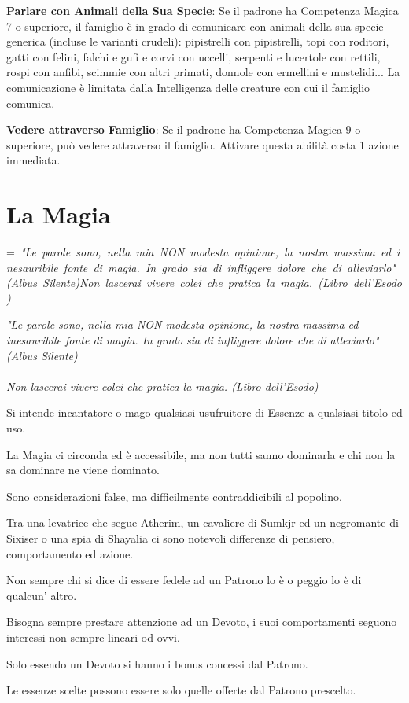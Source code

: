 \documentclass[a4paper,11pt,twoside,openany]{book}
\makeatletter
\newcommand{\mybox}[1]{%
	\setbox0=\hbox{#1}%
	\setlength{\@tempdima}{\dimexpr\wd0+13pt}%
	\begin{tcolorbox}[boxrule=0.5pt,arc=4pt, breakable,enhanced,
		left=6pt,right=6pt,top=6pt,bottom=6pt,boxsep=0pt,width=\@tempdima]
		#1
	\end{tcolorbox}
}
\makeatother
\begin{document}
\textbf{Parlare con Animali della Sua Specie}: Se il padrone ha Competenza Magica 7 o superiore, il famiglio è in grado di comunicare con animali della sua specie generica (incluse le varianti crudeli): pipistrelli con pipistrelli, topi con roditori, gatti con felini, falchi e gufi e corvi con uccelli, serpenti e lucertole con rettili, rospi con anfibi, scimmie con altri primati, donnole con ermellini e mustelidi... La comunicazione è limitata dalla Intelligenza delle creature con cui il famiglio comunica.

\textbf{Vedere attraverso Famiglio}: Se il padrone ha Competenza Magica 9 o superiore, può vedere attraverso il famiglio. Attivare questa abilità costa 1 azione immediata.

\pagebreak

\section{La Magia}

\label{la-magia}
\mybox{\textit{
"Le parole sono, nella mia NON modesta opinione, la nostra massima ed inesauribile fonte di magia. In grado sia di infliggere dolore che di alleviarlo" (Albus Silente)\\\\
Non lascerai vivere colei che pratica la magia. (Libro dell'Esodo)
}}\medskip

Si intende incantatore o mago qualsiasi usufruitore di Essenze a qualsiasi titolo ed uso.

La Magia ci circonda ed è accessibile, ma non tutti sanno dominarla e chi non la sa dominare ne viene dominato.

Sono considerazioni false, ma difficilmente contraddicibili al popolino.

Tra una levatrice che segue Atherim, un cavaliere di Sumkjr ed un negromante di Sixiser o una spia di Shayalia ci sono notevoli differenze di pensiero, comportamento ed azione.

Non sempre chi si dice di essere fedele ad un Patrono lo è o peggio lo è di qualcun' altro.

Bisogna sempre prestare attenzione ad un Devoto, i suoi comportamenti seguono interessi non sempre lineari od ovvi.

Solo essendo un Devoto si hanno i bonus concessi dal Patrono. 

Le essenze scelte possono essere solo quelle offerte dal Patrono prescelto.
\end{document}
